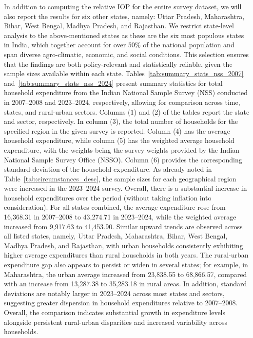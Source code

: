 \documentclass[12pt]{article}
\theoremstyle{plain}
\theoremstyle{definition}
\begin{document}
\begin{table}[htbp]
    \centering\small
    \caption{Distribution of circumstance variables for Indian NSS: 2007--2008 vs 2023--2024}
    
    \label{tab:circumstances_desc}
\end{table}

In addition to computing the relative IOP for the entire survey dataset, we will also report the results for six other states, namely: Uttar Pradesh, Maharashtra, Bihar, West Bengal, Madhya Pradesh, and Rajasthan. We restrict state-level analysis to the above-mentioned states as these are the six most populous states in India, which together account for over 50\% of the national population and span diverse agro-climatic, economic, and social conditions. This selection ensures that the findings are both policy-relevant and statistically reliable, given the sample sizes available within each state. Tables~\ref{tab:summary_stats_nss_2007} and~\ref{tab:summary_stats_nss_2024} present summary statistics for total household expenditure from the Indian National Sample Survey (NSS) conducted in 2007--2008 and 2023--2024, respectively, allowing for comparison across time, states, and rural-urban sectors. Columns (1) and (2) of the tables report the state and sector, respectively. In column (3), the total number of households for the specified region in the given survey is reported. Column (4) has the average household expenditure, while column (5) has the weighted average household expenditure, with the weights being the survey weights provided by the Indian National Sample Survey Office (NSSO). Column (6) provides the corresponding standard deviation of the household expenditure. As already noted in Table~\ref{tab:circumstances_desc}, the sample sizes for each geographical region were increased in the 2023--2024 survey.  Overall, there is a substantial increase in household expenditures over the period (without taking inflation into consideration). For all states combined, the average expenditure rose from 16,368.31 in 2007--2008 to 43,274.71 in 2023--2024, while the weighted average increased from 9,917.63 to 41,453.90. Similar upward trends are observed across all listed states, namely, Uttar Pradesh, Maharashtra, Bihar, West Bengal, Madhya Pradesh, and Rajasthan, with urban households consistently exhibiting higher average expenditures than rural households in both years. The rural-urban expenditure gap also appears to persist or widen in several states; for example, in Maharashtra, the urban average increased from 23,838.55 to 68,866.57, compared with an increase from 13,287.38 to 35,283.18 in rural areas. In addition, standard deviations are notably larger in 2023--2024 across most states and sectors, suggesting greater dispersion in household expenditures relative to 2007--2008. Overall, the comparison indicates substantial growth in expenditure levels alongside persistent rural-urban disparities and increased variability across households.
\end{document}
